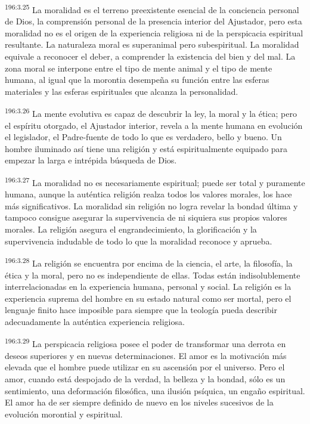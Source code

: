\par
\textsuperscript{196:3.25} La moralidad es el terreno preexistente esencial de la conciencia personal de Dios, la comprensión personal de la presencia interior del Ajustador, pero esta moralidad no es el origen de la experiencia religiosa ni de la perspicacia espiritual resultante. La naturaleza moral es superanimal pero subespiritual. La moralidad equivale a reconocer el deber, a comprender la existencia del bien y del mal. La zona moral se interpone entre el tipo de mente animal y el tipo de mente humana, al igual que la morontia desempeña su función entre las esferas materiales y las esferas espirituales que alcanza la personalidad.

\par
\textsuperscript{196:3.26} La mente evolutiva es capaz de descubrir la ley, la moral y la ética; pero el espíritu otorgado, el Ajustador interior, revela a la mente humana en evolución el legislador, el Padre-fuente de todo lo que es verdadero, bello y bueno. Un hombre iluminado así tiene una religión y está espiritualmente equipado para empezar la larga e intrépida búsqueda de Dios.

\par
\textsuperscript{196:3.27} La moralidad no es necesariamente espiritual; puede ser total y puramente humana, aunque la auténtica religión realza todos los valores morales, los hace más significativos. La moralidad sin religión no logra revelar la bondad última y tampoco consigue asegurar la supervivencia de ni siquiera sus propios valores morales. La religión asegura el engrandecimiento, la glorificación y la supervivencia indudable de todo lo que la moralidad reconoce y aprueba.

\par
\textsuperscript{196:3.28} La religión se encuentra por encima de la ciencia, el arte, la filosofía, la ética y la moral, pero no es independiente de ellas. Todas están indisolublemente interrelacionadas en la experiencia humana, personal y social. La religión es la experiencia suprema del hombre en su estado natural como ser mortal, pero el lenguaje finito hace imposible para siempre que la teología pueda describir adecuadamente la auténtica experiencia religiosa.

\par
\textsuperscript{196:3.29} La perspicacia religiosa posee el poder de transformar una derrota en deseos superiores y en nuevas determinaciones. El amor es la motivación más elevada que el hombre puede utilizar en su ascensión por el universo. Pero el amor, cuando está despojado de la verdad, la belleza y la bondad, sólo es un sentimiento, una deformación filosófica, una ilusión psíquica, un engaño espiritual. El amor ha de ser siempre definido de nuevo en los niveles sucesivos de la evolución morontial y espiritual.

